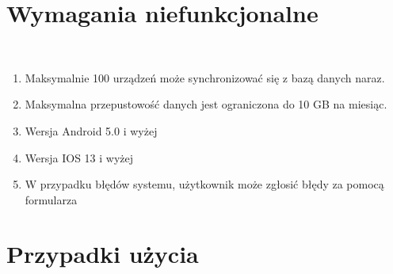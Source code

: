 \section{Wymagania niefunkcjonalne}\\

\begin{enumerate}
  \item Maksymalnie 100 urządzeń może synchronizować się z bazą danych naraz.
  \item Maksymalna przepustowość danych jest ograniczona do 10 GB na miesiąc.
  \item Wersja Android 5.0 i wyżej
  \item Wersja IOS 13 i wyżej
  \item W przypadku błędów systemu, użytkownik może zgłosić błędy za pomocą formularza
\end{enumerate}


  
\section{Przypadki użycia}\\
